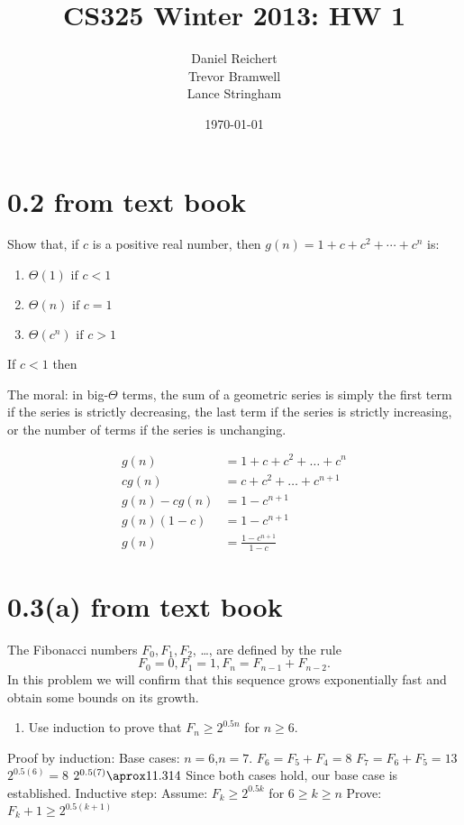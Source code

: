 \documentclass[12pt]{article}
\title{CS325 Winter 2013: HW 1}
\author{
    Daniel Reichert \\
    Trevor Bramwell \\
    Lance Stringham
}
\date{\today}
\begin{document}
\maketitle

\section*{0.2 from text book}
Show that, if $c$ is a positive real number, then $g(n)=1+c+c^2+\cdots+c^n$ is:

\begin{enumerate}
\item $\Theta(1) \text{ if } c < 1$
\item $\Theta(n) \text{ if } c = 1$
\item $\Theta(c^n) \text{ if } c > 1$
\end{enumerate}

If $ c < 1 $ then 

The moral: in big-$\Theta$ terms, the sum of a geometric series is simply the
first term if the series is
strictly decreasing, the last term if the series is strictly increasing,
or the number of terms if the
series is unchanging.

\begin{align*}
    g(n) &= 1 + c + c^2 + \dots + c^{n} \\
    cg(n) &= c + c^2 + \dots + c^{n+1} \\
    g(n) - cg(n) &= 1 - c^{n+1} \\
    g(n)(1 - c) &= 1 - c^{n+1} \\
    g(n) &= \frac{1 - c^{n+1}}{1 - c}
\end{align*}

\section*{0.3(a) from text book}

The Fibonacci numbers $F_0, F_1, F_2$, \ldots, are defined by the rule
\[ F_0 = 0, F_1 = 1, F_n = F_{n - 1} + F_{n - 2}. \]
In this problem we will confirm that this sequence grows exponentially
fast and obtain some
bounds on its growth.
\begin{enumerate}
\item Use induction to prove that $F_n \geq 2^{0.5n}$ for $n \geq 6$.
\end{enumerate}
Proof by induction:
	Base cases: $n=6$,$n=7$.
	$F_6 = F_5 + F_4 = 8$
	$F_7 = F_6 + F_5 = 13$
	$2^{0.5(6)} = 8$
	$2^{0.5(7)} \aprox 11.314$
	Since both cases hold, our base case is established.
Inductive step:
	Assume: $F_k \geq 2^{0.5k}$ for $6 \geq k \geq n$
	Prove: $F_k+1 \geq 2^{0.5(k+1)}$
\end{document}
